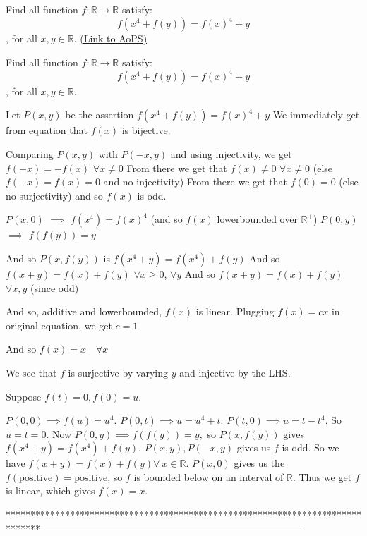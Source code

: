\begin{problem}
	Find all function $ f:\mathbb{R}\rightarrow \mathbb{R} $ satisfy: \[ f(x^4+f(y))=f(x)^4+y\], for all $x,y\in\mathbb R.$
	\flushright \href{https://artofproblemsolving.com/community/c6h1586095}{(Link to AoPS)}
\end{problem}



\begin{solution}
	\begin{tcolorbox}Find all function $ f:\mathbb{R}\rightarrow \mathbb{R} $ satisfy: \[ f(x^4+f(y))=f(x)^4+y\], for all $x,y\in\mathbb R.$\end{tcolorbox}
Let $P(x,y)$ be the assertion $f(x^4+f(y))=f(x)^4+y$
We immediately get from equation that $f(x)$ is bijective.

Comparing $P(x,y)$ with $P(-x,y)$ and using injectivity, we get $f(-x)=-f(x)$ $\forall x\ne 0$
From there we get that $f(x)\ne 0$ $\forall x\ne 0$ (else $f(-x)=f(x)=0$ and no injectivity)
From there we get that $f(0)=0$ (else no surjectivity) and so $f(x)$ is odd.

$P(x,0)$ $\implies$ $f(x^4)=f(x)^4$ (and so $f(x)$ lowerbounded over $\mathbb R^+$)
$P(0,y)$ $\implies$ $f(f(y))=y$

And so $P(x,f(y))$ is $f(x^4+y)=f(x^4)+f(y)$
And so $f(x+y)=f(x)+f(y)$ $\forall x\ge 0$, $\forall y$
And so $f(x+y)=f(x)+f(y)$ $\forall x,y$ (since odd)

And so, additive and lowerbounded, $f(x)$ is linear.
Plugging $f(x)=cx$ in original equation, we get $c=1$

And so $\boxed{f(x)=x\quad\forall x}$


\end{solution}



\begin{solution}
	We see that $f$ is surjective by varying $y$ and injective by the LHS.

Suppose $f(t)=0, f(0) = u$. 

$P(0,0) \implies f(u) = u^4$. $P(0,t) \implies u=u^4+t$. $P(t,0) \implies u=t-t^4$. So $u=t=0$. 
Now $P(0,y) \implies f(f(y))=y,$ so $P(x,f(y))$ gives $f(x^4+y) = f(x^4)+f(y)$. 
$P(x,y), P(-x,y)$ gives us $f$ is odd. So we have $f(x+y)=f(x)+f(y) \forall \ x \in \mathbb{R}$. 
$P(x,0)$ gives us the $f(\text{positive}) = \text{positive}$, so $f$ is bounded below on an interval of $\mathbb{R}$. Thus we get $f$ is linear, which gives $f(x)=x$.

\end{solution}
*******************************************************************************
-------------------------------------------------------------------------------

